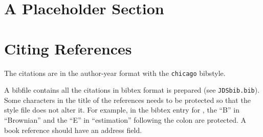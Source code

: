 \documentclass[letterpaper, inpress]{jds} %
\begin{document}


\section{A Placeholder Section}%
\label{sec:placeholder}

\lipsum[4-7]

\section{Citing References}%
\label{sec:citations}

The citations are in the author-year format with the
\texttt{chicago} bibstyle.

A bibfile contains all the citations in
bibtex format is prepared (see \texttt{JDSbib.bib}). Some characters
in the title of the references needs to be protected so that the style
file does not alter it. For example, in the bibtex entry for
\citet{Pozd:etal:2017}, the ``B'' in ``Brownian'' and the ``E'' in
``estimation''  following the colon are protected.
A book reference \citep[e.g.,][]{Kotz2001} should have an address field.
\end{document}
